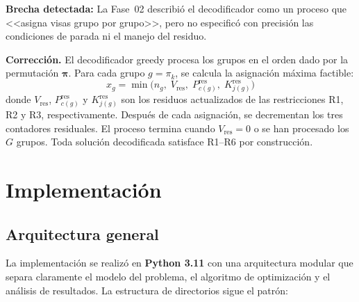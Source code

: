 \documentclass[12pt,letterpaper]{article}
\begin{document}
\begin{notebox}
\textbf{Brecha detectada:} La Fase~02 describió el decodificador como un proceso que <<asigna visas grupo por grupo>>, pero no especificó con precisión las condiciones de parada ni el manejo del residuo.
\end{notebox}

\textbf{Corrección.} El decodificador greedy procesa los grupos en el orden dado por la permutación $\boldsymbol{\pi}$. Para cada grupo $g = \pi_k$, se calcula la asignación máxima factible:
\[
x_g = \min\!\Big(n_g,\; V_{\text{res}},\; P_{c(g)}^{\text{res}},\; K_{j(g)}^{\text{res}}\Big)
\]
donde $V_{\text{res}}$, $P_{c(g)}^{\text{res}}$ y $K_{j(g)}^{\text{res}}$ son los residuos actualizados de las restricciones R1, R2 y R3, respectivamente. Después de cada asignación, se decrementan los tres contadores residuales. El proceso termina cuando $V_{\text{res}} = 0$ o se han procesado los $G$ grupos. Toda solución decodificada satisface R1--R6 por construcción.

\newpage
\section{Implementación}
\label{sec:implementacion}

\subsection{Arquitectura general}

La implementación se realizó en \textbf{Python 3.11} con una arquitectura modular que separa claramente el modelo del problema, el algoritmo de optimización y el análisis de resultados. La estructura de directorios sigue el patrón:
\end{document}
